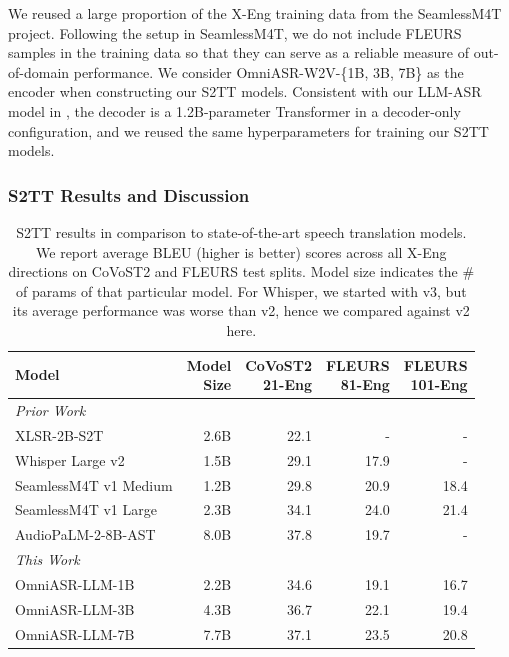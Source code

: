\documentclass[]{fairmeta}
\begin{document}
We reused a large proportion of the X-Eng training data from the SeamlessM4T project.  Following the setup in SeamlessM4T, we do not include FLEURS samples in the training data so that they can serve as a reliable measure of out-of-domain performance. We consider OmniASR-W2V-\{1B, 3B, 7B\} as the encoder when constructing our S2TT models.
Consistent with our LLM-ASR model in , the decoder is a 1.2B-parameter Transformer in a decoder-only configuration, and we reused the same hyperparameters for training our S2TT models.

\subsubsection{S2TT Results and Discussion}

\begin{table}[htbp]
  \centering
  \begin{tabular}{lrrrr}
    \toprule
    Model  &  \makecell{Model\\Size}  &  \makecell{CoVoST2\\21-Eng}  &  \makecell{FLEURS\\81-Eng}  &  \makecell{FLEURS\\101-Eng} \\
    \midrule
    \textit{Prior Work} \\
    XLSR-2B-S2T~\citep{babu2021xls}    &  2.6B  &  22.1  &    -   &   -     \\
    Whisper Large v2                   &  1.5B  &  29.1  &  17.9  &   -     \\
    SeamlessM4T v1 Medium              &  1.2B  &  29.8  &  20.9  &  18.4   \\
    SeamlessM4T v1 Large               &  2.3B  &  34.1  &  24.0  &  21.4   \\
    AudioPaLM-2-8B-AST~\citep{rubenstein2023audiopalm}   &  8.0B  &  37.8  &  19.7  &   -  \\
    \midrule
    \textit{This Work} \\
    OmniASR-LLM-1B                     &  2.2B  &  34.6  &  19.1  &  16.7   \\
    OmniASR-LLM-3B                     &  4.3B  &  36.7  &  22.1  &  19.4   \\
    OmniASR-LLM-7B                     &  7.7B  &  37.1  &  23.5  &  20.8   \\
    \bottomrule
  \end{tabular}
  \caption{\OmniASR S2TT results in comparison to state-of-the-art speech translation models. We report average BLEU (higher is better) scores across all X-Eng directions on CoVoST2 and FLEURS test splits. Model size indicates the \# of params of that particular model. For Whisper, we started with v3, but its average performance was worse than v2, hence we compared against v2 here.}
  \label{tab:s2tt_results}
\end{table}
\end{document}
